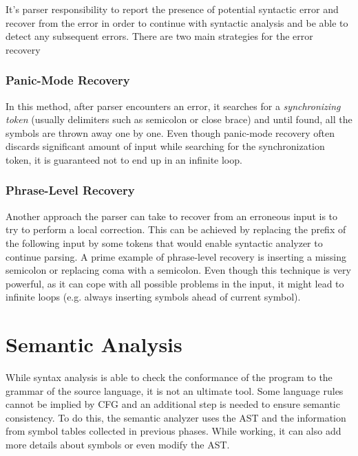 \documentclass[
  digital, %
  table,   %
  lof,     %
  lot,     %
  oneside,
]{fithesis3}
\begin{document}
It's parser responsibility to report the presence of potential syntactic error and recover from the error in order to continue with syntactic analysis and be able to detect any subsequent errors. There are two main strategies for the error recovery~\cite{dragon-book}

  \subsubsection{Panic-Mode Recovery}
In this method, after parser encounters an error, it searches for a \textit{synchronizing token} (usually delimiters such as semicolon or close brace) and until found, all the symbols are thrown away one by one. Even though panic-mode recovery often discards significant amount of input while searching for the synchronization token, it is guaranteed not to end up in an infinite loop.

  \subsubsection{Phrase-Level Recovery}
Another approach the parser can take to recover from an erroneous input is to try to perform a local correction. This can be achieved by replacing the prefix of the following input by some tokens that would enable syntactic analyzer to continue parsing. A prime example of phrase-level recovery is inserting a missing semicolon or replacing coma with a semicolon. Even though this technique is very powerful, as it can cope with all possible problems in the input, it might lead to infinite loops (e.g. always inserting symbols ahead of current symbol).

  \section{Semantic Analysis}
While syntax analysis is able to check the conformance of the program to the grammar of the source language, it is not an ultimate tool. Some language rules cannot be implied by CFG and an additional step is needed to ensure semantic consistency. To do this, the semantic analyzer uses the AST and the information from symbol tables collected in previous phases. While working, it can also add more details about symbols or even modify the AST. 
\end{document}
